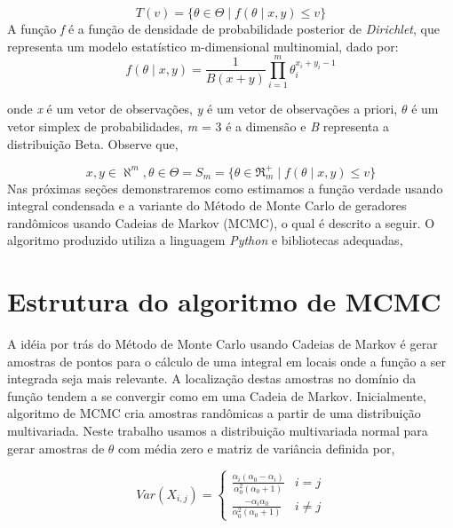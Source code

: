 \documentclass{article}
\begin{document}
\begin{equation}
    T(v)=\{ \theta  \in   \Theta  \mid f(\theta\mid x,y)\leq v\}
\end{equation}
\indent
A função \textit{f} é a função de densidade de probabilidade posterior de \textit{Dirichlet}, que representa um modelo estatístico m-dimensional multinomial, dado por:
\begin{equation}
    f(\theta\mid x,y) =  \frac{1}{B(x+y)}  \prod_{i=1}^m  \theta_i^{x_i+y_i-1} 
\end{equation}

onde \textit{x} é um vetor de observações, \textit{y} é um vetor de observações a priori, $\theta$ é um vetor simplex de probabilidades, \textit{m} = 3 é a dimensão e \textit{B} representa a distribuição Beta. Observe que, 

\begin{equation}
    x,y \in   \aleph ^m,  \theta  \in  \Theta =S_m=\{ \theta  \in  \Re _m^+ \mid f(\theta\mid x,y)\leq v\}
\end{equation}
\indent
Nas próximas seções demonstraremos como estimamos a função verdade usando integral condensada e a variante do Método de Monte Carlo de geradores randômicos usando Cadeias de Markov (MCMC), o qual é descrito a seguir. O algoritmo produzido utiliza a linguagem \textit{Python} e bibliotecas adequadas\cite{harris2020array, Waskom2021, Hunter:2007, 2020SciPy-NMeth}, 

\section{Estrutura do algoritmo de MCMC}
\indent
A idéia por trás do Método de Monte Carlo usando Cadeias de Markov é gerar amostras de pontos para o cálculo de uma integral em locais onde a função a ser integrada seja mais relevante. A localização destas amostras no domínio da função tendem a se convergir como em uma Cadeia de Markov. Inicialmente, algoritmo de MCMC cria amostras randômicas a partir de uma distribuição multivariada. Neste trabalho usamos a distribuição multivariada normal para gerar amostras de $\theta$ com média zero e matriz de variância definida por,

\begin{equation}
    Var(X_{i,j})=\left\{\begin{matrix}
\frac{\alpha _i(\alpha _0-\alpha _i)}{\alpha _0^2(\alpha _0+1)} & i=j\\ 
\frac{-\alpha _i\alpha _0}{\alpha _0^2(\alpha _0+1)} & i\neq j
\end{matrix}\right.
\end{equation}
\end{document}
